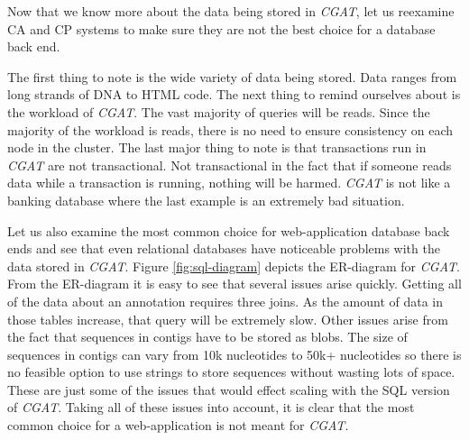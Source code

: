 \documentclass[12pt]{ucthesis}
\begin{document}
Now that we know more about the data being stored in \textit{CGAT}, let us reexamine CA and CP systems
to make sure they are not the best choice for a database back end. 

The first thing to note is the wide variety of data being stored. Data ranges from long strands of DNA to
HTML code. The next thing to remind ourselves about is the workload of \textit{CGAT}. The vast majority of
queries will be reads. Since the majority of the workload is reads, there is no need to ensure consistency on
each node in the cluster. The last major thing to note is that transactions run in \textit{CGAT} are not transactional. Not transactional in the fact that if someone reads data while a transaction is running, nothing 
will be harmed. \textit{CGAT} is not like a banking database where the last example is an extremely bad situation.

Let us also examine the most common choice for web-application database back ends and see that
even relational databases have noticeable problems with the data stored in \textit{CGAT}. Figure \ref{fig:sql-diagram} depicts the ER-diagram for \textit{CGAT}. From the ER-diagram it is easy to see that several issues arise quickly. Getting all of the data about an annotation requires three joins. As the amount of data in those tables increase, that query will be extremely slow. Other issues arise from the fact that sequences in contigs have to be stored as blobs. The size of sequences in contigs can vary from 10k nucleotides to 50k+ nucleotides
so there is no feasible option to use strings to store sequences without wasting lots of space. These
are just some of the issues that would effect scaling with the SQL version of \textit{CGAT}. Taking all
of these issues into account, it is clear that the most common choice for a web-application is not meant for \textit{CGAT}.
\end{document}
